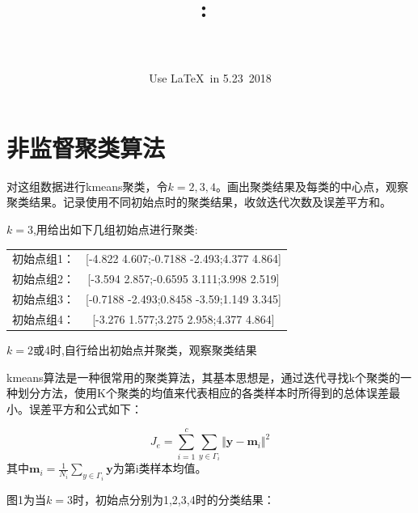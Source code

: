 \documentclass{article}
\title{
    \vspace{2in}
    \textmd{\textbf{\hmwkClass:\ \hmwkTitle}}\\
    \vspace{0.5cm}\LARGE{\textit{\hmwkClassInstructor}}
    \vspace{4in}
}
\author{\hmwkAuthorName\\
{\schoolID}\\
Use \LaTeX ~in 5.23~2018}
\date{}
\newcommand{\hs}{\hspace{2em}}
\begin{document}
\maketitle
\setcounter{page}{0}
\thispagestyle{empty}
\pagebreak

\section{非监督聚类算法}
{}

\hs 对这组数据进行kmeans聚类，令$k=2,3,4$。画出聚类结果及每类的中心点，观察聚类结果。记录使用不同初始点时的聚类结果，收敛迭代次数及误差平方和。

\hs $k=3$,用给出如下几组初始点进行聚类:

\begin{tabular}{cc}
	\hs 初始点组1：& [-4.822 4.607;-0.7188 -2.493;4.377 4.864] \\
	\hs 初始点组2：& [-3.594 2.857;-0.6595 3.111;3.998 2.519] \\
	\hs 初始点组3：& [-0.7188 -2.493;0.8458 -3.59;1.149 3.345] \\
	\hs 初始点组4：& [-3.276 1.577;3.275 2.958;4.377 4.864] \\
\end{tabular}

\hs $k=2$或4时,自行给出初始点并聚类，观察聚类结果

{}

\hs kmeans算法是一种很常用的聚类算法，其基本思想是，通过迭代寻找k个聚类的一种划分方法，使用K个聚类的均值来代表相应的各类样本时所得到的总体误差最小。误差平方和公式如下：

\begin{equation*}
J_e=\sum_{i=1}^{c}\sum_{y\in\Gamma_i}\Vert\bm {y}-{\bm m}_i\Vert^2
\end{equation*}
其中$\bm{m}_i=\frac{1}{N_i}\sum_{y\in\Gamma_i}\bm{y}$为第i类样本均值。

\hs 图1为当$k=3$时，初始点分别为1,2,3,4时的分类结果：
\end{document}
